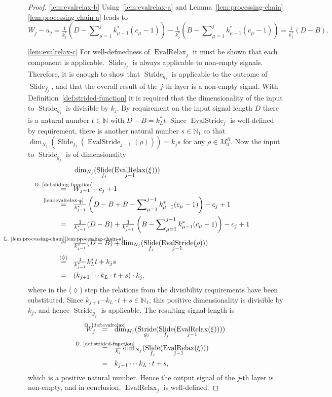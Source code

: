\documentclass[journal]{IEEEtran}
\newcommand{\N}{\mathbb{N}}
\newcommand{\ROI}{B}
\DeclareMathOperator{\Slide}{Slide}
\DeclareMathOperator{\Stride}{Stride}
\DeclareMathOperator{\EvalStride}{EvalStride}
\newcommand{\equsing}[1]{\overset{\mathclap{\text{#1}}}{=}}
\DeclareMathOperator{\EvalRelax}{EvalRelax}
\begin{document}
\begin{proof}
\ref{lem:evalrelax-b}
Using~\ref{lem:evalrelax-a} and Lemma~\ref{lem:processing-chain}\ref{lem:processing-chain-a} leads to
\begin{displaymath}
  W_j - u_j
  = \tfrac{1}{k_j^*}\left(D - \sum\nolimits_{\mu = 1}^j k_{\mu - 1}^*(c_\mu - 1)\right) - \tfrac{1}{k_j^*}\left(\ROI - \sum\nolimits_{\mu = 1}^j k_{\mu - 1}^*(c_\mu - 1)\right)
  = \tfrac{1}{k_j^*}(D - \ROI)\text{.}
\end{displaymath}

\ref{lem:evalrelax-c}
For well-definedness of $\EvalRelax_j$ it must be shown that each component is applicable.
$\Slide_{f_j}$ is always applicable to non-empty signals.
Therefore, it is enough to show that $\Stride_{g_j}$ is applicable to the outcome of $\Slide_{f_j}$, and that the overall result of the $j$-th layer is a non-empty signal.
With Definition~\ref{def:strided-function} it is required that the dimensionality of the input to $\Stride_{g_j}$ is divisible by $k_j$.
By requirement on the input signal length $D$ there is a natural number $t\in\N$ with $D - \ROI = k_L^* t$.
Since $\EvalStride_j$ is well-defined by requirement, there is another natural number $s\in\N_1$ so that $\dim_{N_j}(\Slide_{f_j}(\EvalStride_{j - 1}(\rho))) = k_j s$ for any $\rho\in M_0^\ROI$.
Now the input to $\Stride_{g_j}$ is of dimensionality
\begin{align*}
  & \dim_{N_j}(\Slide_{f_j}(\EvalRelax_{j - 1}(\xi)))\\
  \equsing{D.~\ref{def:sliding-function}}\ \ \ & W_{j - 1} - c_j + 1\\
  \equsing{\ref{lem:evalrelax-a}}\ \ \ & \tfrac{1}{k_{j - 1}^*}\left(D - \ROI + \ROI - \sum\nolimits_{\mu = 1}^{j - 1} k_{\mu - 1}^*(c_\mu - 1)\right) - c_j + 1\\
  =\ \ \ & \tfrac{1}{k_{j - 1}^*}(D - \ROI) + \tfrac{1}{k_{j - 1}^*}\left(\ROI - \sum\nolimits_{\mu = 1}^{j - 1} k_{\mu - 1}^*(c_\mu - 1)\right) - c_j + 1\\
  \equsing{L.~\ref{lem:processing-chain}\ref{lem:processing-chain-a}}\ \ \ & \tfrac{1}{k_{j - 1}^*}(D - \ROI) + \dim_{N_j}(\Slide_{f_j}(\EvalStride_{j - 1}(\rho)))\\
  \equsing{($\lozenge$)}\ \ \ & \tfrac{1}{k_{j - 1}^*}k_L^* t + k_j s\\
  =\ \ \ & (k_{j + 1}\cdots k_L\cdot t + s)\cdot k_j\text{,}
\end{align*}
where in the ($\lozenge$) step the relations from the divisibility requirements have been substituted.
Since $k_{j + 1}\cdots k_L\cdot t + s\in\N_1$, this positive dimensionality is divisible by $k_j$, and hence $\Stride_{g_j}$ is applicable.
The resulting signal length is
\begin{align*}
  W_j\ \ &\equsing{D.~\ref{def:evalrelax}}\ \ \dim_{M_j}(\Stride_{g_j}(\Slide_{f_j}(\EvalRelax_{j - 1}(\xi))))\\
  &\equsing{D.~\ref{def:strided-function}}\ \ \tfrac{1}{k_j}\dim_{N_j}(\Slide_{f_j}(\EvalRelax_{j - 1}(\xi)))\\
  &=\ \ k_{j + 1}\cdots k_L\cdot t + s\text{,}
\end{align*}
which is a positive natural number.
Hence the output signal of the $j$-th layer is non-empty, and in conclusion, $\EvalRelax_j$ is well-defined.


\end{proof}
\end{document}
